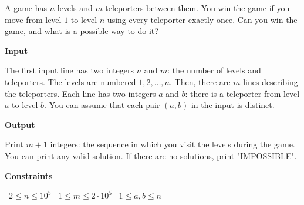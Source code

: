 A game has $n$ levels and $m$ teleporters between them. You win the game if you move from level $1$ to level $n$ using every teleporter exactly once.
Can you win the game, and what is a possible way to do it?

\vspace{0.3cm}\noindent\textbf{Input}

The first input line has two integers $n$ and $m$: the number of levels and teleporters. The levels are numbered $1,2,\dots,n$.
Then, there are $m$ lines describing the teleporters. Each line has two integers $a$ and $b$: there is a teleporter from level $a$ to level $b$.
You can assume that each pair $(a,b)$ in the input is distinct.

\vspace{0.3cm}\noindent\textbf{Output}

Print $m+1$ integers: the sequence in which you visit the levels during the game. You can print any valid solution.
If there are no solutions, print "IMPOSSIBLE".

\vspace{0.3cm}\noindent\textbf{Constraints}

\textbullet\ $2 \le n \le 10^5$
\textbullet\ $1 \le m \le 2 \cdot 10^5$
\textbullet\ $1 \le a,b \le n$